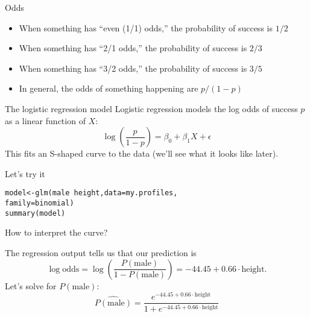 \documentclass{beamer}\usepackage[]{graphicx}\usepackage[]{color}
\makeatletter
\newcommand{\hlopt}[1]{\textcolor[rgb]{1,0.894,0.769}{#1}}%
\newcommand{\hlstd}[1]{\textcolor[rgb]{1,0.894,0.769}{#1}}%
\newcommand{\hlkwb}[1]{\textcolor[rgb]{0.804,0.776,0.451}{#1}}%
\newcommand{\hlkwc}[1]{\textcolor[rgb]{0.78,0.941,0.545}{#1}}%
\newcommand{\hlkwd}[1]{\textcolor[rgb]{1,0.78,0.769}{#1}}%
\newenvironment{kframe}{%
 \def\at@end@of@kframe{}%
 \ifinner\ifhmode%
  \def\at@end@of@kframe{\end{minipage}}%
  \begin{minipage}{\columnwidth}%
 \fi\fi%
 \def\FrameCommand##1{\hskip\@totalleftmargin \hskip-\fboxsep
 \colorbox{shadecolor}{##1}\hskip-\fboxsep
     \hskip-\linewidth \hskip-\@totalleftmargin \hskip\columnwidth}%
 \MakeFramed {\advance\hsize-\width
   \@totalleftmargin\z@ \linewidth\hsize
   \@setminipage}}%
 {\par\unskip\endMakeFramed%
 \at@end@of@kframe}
\newenvironment{knitrout}{}{} %
\makeatother
\begin{document}
\begin{darkframes}
    \begin{frame}{Odds}
      \begin{itemize}[<+->]
        \item When something has ``even (1/1) odds,'' the probability of success is $1/2$
        \item When something has ``2/1 odds,'' the probability of success is $2/3$
        \item When something has ``3/2 odds,'' the probability of success is $3/5$
        \item In general, the odds of something happening are $p/(1-p)$
      \end{itemize}
    \end{frame}

    \begin{frame}{The logistic regression model}
      Logistic regression models the \alert{log odds} of success $p$ as a linear function of $X$:
      \[
        \log\left(\frac{p}{1-p}\right) = \beta_0 + \beta_1 X + \epsilon
      \]
      This fits an S-shaped curve to the data (we'll see what it looks like later).
    \end{frame}

    \begin{frame}[fragile]{Let's try it}
\begin{knitrout}
\begin{kframe}
\begin{alltt}
\hlstd{model} \hlkwb{<-} \hlkwd{glm}\hlstd{(male} \hlopt{~} \hlstd{height,} \hlkwc{data}\hlstd{=my.profiles,}
             \hlkwc{family}\hlstd{=binomial)}
\hlkwd{summary}\hlstd{(model)}
\end{alltt}
\end{kframe}
\end{knitrout}
    \end{frame}

    \begin{frame}{How to interpret the curve?}
      
      The regression output tells us that our prediction is
      \[
        \log\text{odds} = \log\left(\frac{P(\text{male})}{1-P(\text{male})}\right) = -44.45 + 0.66\cdot\text{height}.
      \]
      \pause
      Let's solve for $P(\text{male})$:
      \[
        \widehat{P(\text{male})} = \frac{e^{-44.45 + 0.66\cdot\text{height}}}{1 + e^{-44.45 + 0.66\cdot\text{height}}}
      \]
    \end{frame}


\end{darkframes}
\end{document}
